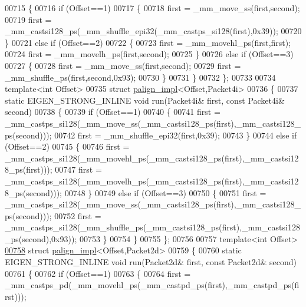 \begin{DoxyCode}
{{00715   \{
00716     \textcolor{keywordflow}{if} (Offset==1)
00717     \{
00718       first = \_mm\_move\_ss(first,second);
00719       first = \_mm\_castsi128\_ps(\_mm\_shuffle\_epi32(\_mm\_castps\_si128(first),0x39));
00720     \}
00721     \textcolor{keywordflow}{else} \textcolor{keywordflow}{if} (Offset==2)
00722     \{
00723       first = \_mm\_movehl\_ps(first,first);
00724       first = \_mm\_movelh\_ps(first,second);
00725     \}
00726     \textcolor{keywordflow}{else} \textcolor{keywordflow}{if} (Offset==3)
00727     \{
00728       first = \_mm\_move\_ss(first,second);
00729       first = \_mm\_shuffle\_ps(first,second,0x93);
00730     \}
00731   \}
00732 \};
00733 
00734 \textcolor{keyword}{template}<\textcolor{keywordtype}{int} Offset>
00735 \textcolor{keyword}{struct }\hyperlink{struct_eigen_1_1internal_1_1palign__impl}{palign\_impl}<Offset,Packet4i>
00736 \{
00737   \textcolor{keyword}{static} EIGEN\_STRONG\_INLINE \textcolor{keywordtype}{void} run(Packet4i& first, \textcolor{keyword}{const} Packet4i& second)
00738   \{
00739     \textcolor{keywordflow}{if} (Offset==1)
00740     \{
00741       first = \_mm\_castps\_si128(\_mm\_move\_ss(\_mm\_castsi128\_ps(first),\_mm\_castsi128\_ps(second)));
00742       first = \_mm\_shuffle\_epi32(first,0x39);
00743     \}
00744     \textcolor{keywordflow}{else} \textcolor{keywordflow}{if} (Offset==2)
00745     \{
00746       first = \_mm\_castps\_si128(\_mm\_movehl\_ps(\_mm\_castsi128\_ps(first),\_mm\_castsi128\_ps(first)));
00747       first = \_mm\_castps\_si128(\_mm\_movelh\_ps(\_mm\_castsi128\_ps(first),\_mm\_castsi128\_ps(second)));
00748     \}
00749     \textcolor{keywordflow}{else} \textcolor{keywordflow}{if} (Offset==3)
00750     \{
00751       first = \_mm\_castps\_si128(\_mm\_move\_ss(\_mm\_castsi128\_ps(first),\_mm\_castsi128\_ps(second)));
00752       first = \_mm\_castps\_si128(\_mm\_shuffle\_ps(\_mm\_castsi128\_ps(first),\_mm\_castsi128\_ps(second),0x93));
00753     \}
00754   \}
00755 \};
00756 
00757 \textcolor{keyword}{template}<\textcolor{keywordtype}{int} Offset>
\hyperlink{struct_eigen_1_1internal_1_1palign__impl_3_01_offset_00_01_packet2d_01_4}{00758} \textcolor{keyword}{struct }\hyperlink{struct_eigen_1_1internal_1_1palign__impl}{palign\_impl}<Offset,Packet2d>
00759 \{
00760   \textcolor{keyword}{static} EIGEN\_STRONG\_INLINE \textcolor{keywordtype}{void} run(Packet2d& first, \textcolor{keyword}{const} Packet2d& second)
00761   \{
00762     \textcolor{keywordflow}{if} (Offset==1)
00763     \{
00764       first = \_mm\_castps\_pd(\_mm\_movehl\_ps(\_mm\_castpd\_ps(first),\_mm\_castpd\_ps(first)));
}}
\end{DoxyCode}
